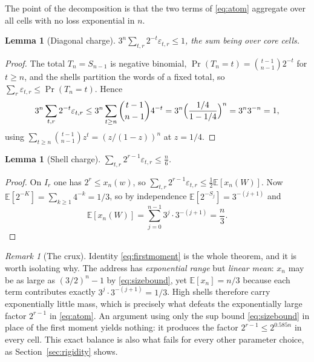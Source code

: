 \documentclass[11pt,reqno]{amsart}
\theoremstyle{plain}
\newtheorem{lemma}[theorem]{Lemma}
\theoremstyle{definition}
\theoremstyle{remark}
\newtheorem{remark}[theorem]{Remark}
\newcommand{\E}{\mathbb{E}}
\newcommand{\Prob}{\operatorname{Pr}}
\begin{document}
The point of the decomposition is that the two terms of \eqref{eq:atom}
aggregate over all cells with no loss exponential in $n$.

\begin{lemma}[Diagonal charge]\label{lem:diag}
$\displaystyle 3^n\sum_{t,r}2^{-t}\varepsilon_{t,r}\le1$, the sum being over
core cells.
\end{lemma}

\begin{proof}
The total $T_n=S_{n-1}$ is negative binomial,
$\Prob(T_n=t)=\binom{t-1}{n-1}2^{-t}$ for $t\ge n$, and the shells
partition the words of a fixed total, so $\sum_r\varepsilon_{t,r}\le\Prob(T_n=t)$.
Hence
\[
3^n\sum_{t,r}2^{-t}\varepsilon_{t,r}
\le3^n\sum_{t\ge n}\binom{t-1}{n-1}4^{-t}
=3^n\Bigl(\frac{1/4}{1-1/4}\Bigr)^n=3^n3^{-n}=1,
\]
using $\sum_{t\ge n}\binom{t-1}{n-1}z^t=(z/(1-z))^n$ at $z=1/4$.
\end{proof}

\begin{lemma}[Shell charge]\label{lem:shell}
$\displaystyle \sum_{t,r}2^{r-1}\varepsilon_{t,r}\le\frac n6$.
\end{lemma}

\begin{proof}
On $I_r$ one has $2^r\le x_n(w)$, so
$\sum_{t,r}2^{r-1}\varepsilon_{t,r}\le\tfrac12\E[x_n(W)]$. Now
$\E[2^{-K}]=\sum_{k\ge1}4^{-k}=1/3$, so by independence
$\E[2^{-S_j}]=3^{-(j+1)}$ and
\begin{equation}
\E[x_n(W)]=\sum_{j=0}^{n-1}3^j\cdot3^{-(j+1)}=\frac n3 .
\label{eq:firstmoment}
\end{equation}
\end{proof}

\begin{remark}[The crux]\label{rem:crux}
Identity \eqref{eq:firstmoment} is the whole theorem, and it is worth
isolating why. The address has \emph{exponential range} but \emph{linear
mean}: $x_n$ may be as large as $(3/2)^n-1$ by \eqref{eq:sizebound}, yet
$\E[x_n]=n/3$ because each term contributes exactly
$3^j\cdot3^{-(j+1)}=1/3$. High shells therefore carry exponentially little
mass, which is precisely what defeats the exponentially large factor
$2^{r-1}$ in \eqref{eq:atom}. An argument using only the sup bound
\eqref{eq:sizebound} in place of the first moment yields nothing: it
produces the factor $2^{r-1}\le2^{0.585n}$ in every cell. This exact
balance is also what fails for every other parameter choice, as
Section~\ref{sec:rigidity} shows.
\end{remark}
\end{document}
